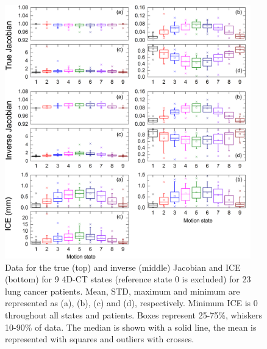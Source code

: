 \begin{figure}[H]
	\begin{center}		
		\includegraphics[width=0.95\textwidth]{./Vmm/Images/Jacobian_data.png}
		\caption{Data for the true (top) and inverse (middle) Jacobian and ICE (bottom) for 9 4D-CT states (reference state 0 is excluded) for 23 lung cancer patients. Mean, STD, maximum and minimum are represented as (a), (b), (c) and (d), respectively.
		Minimum ICE is 0 throughout all states and patients. Boxes represent 25-75\%, whiskers 10-90\%
		of data. The median is shown with a solid line, the mean is represented with squares and outliers with crosses.}
		\label{jacobian_data}
	\end{center}
\end{figure}

\newpage




